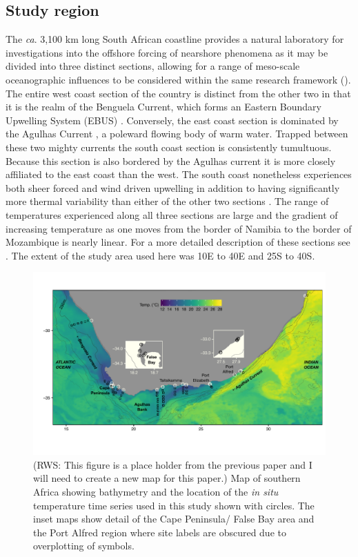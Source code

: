 \documentclass[a4paper,10pt,review]{elsarticle}
\begin{document}
\subsection{Study region}
The \emph{ca}. 3,100 km long South African coastline provides a natural laboratory for investigations into the offshore forcing of nearshore phenomena as it may be divided into three distinct sections, allowing for a range of meso-scale oceanographic influences to be considered within the same research framework (). The entire west coast section of the country is distinct from the other two in that it is the realm of the Benguela Current, which forms an Eastern Boundary Upwelling System (EBUS) \citep{Hutchings2009}. Conversely, the east coast section is dominated by the Agulhas Current \citep{Luning1990}, a poleward flowing body of warm water. Trapped between these two mighty currents the south coast section is consistently tumultuous. Because this section is also bordered by the Agulhas current it is more closely affiliated to the east coast than the west. The south coast nonetheless experiences both sheer forced and wind driven upwelling in addition to having significantly more thermal variability than either of the other two sections \citep{Schlegel2016}. The range of temperatures experienced along all three sections are large and the gradient of increasing temperature as one moves from the border of Namibia to the border of Mozambique is nearly linear. For a more detailed description of these sections see \citet{Smit2013}. The extent of the study area used here was 10\degree E to 40\degree E and 25\degree S to 40\degree S.

\begin{figure}
\includegraphics[width=1.0\textwidth]{figure_1.pdf}
\caption{(RWS: This figure is a place holder from the previous paper and I will need to create a new map for this paper.) Map of southern Africa showing bathymetry and the location of the \emph{in situ} temperature time series used in this study shown with circles. The inset maps show detail of the Cape Peninsula/ False Bay area and the Port Alfred region where site labels are obscured due to overplotting of symbols.}
\label{figure1}
\end{figure}
\end{document}
